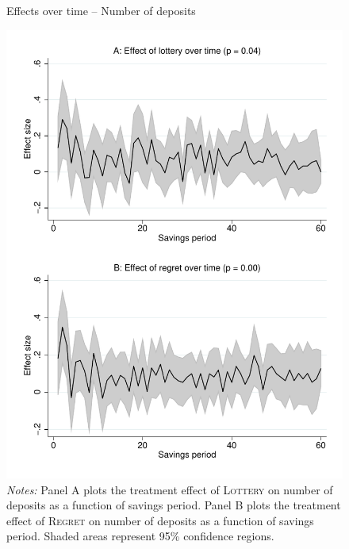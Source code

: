 \documentclass[12pt]{article}
\begin{document}
	\begin{figure}[h]
	\centering
	\caption{Effects over time -- Number of deposits}
	\centerfloat
	\includegraphics[width=\textwidth]{../../figures/line-timemobile_deposits.pdf}
	\caption*{\footnotesize \emph{Notes:} Panel A plots the treatment effect of \textsc{Lottery} on number of deposits as a function of savings period. Panel B plots the treatment effect of \textsc{Regret} on number of deposits as a function of savings period. Shaded areas represent 95\% confidence regions.}
	\end{figure}

\end{document}
